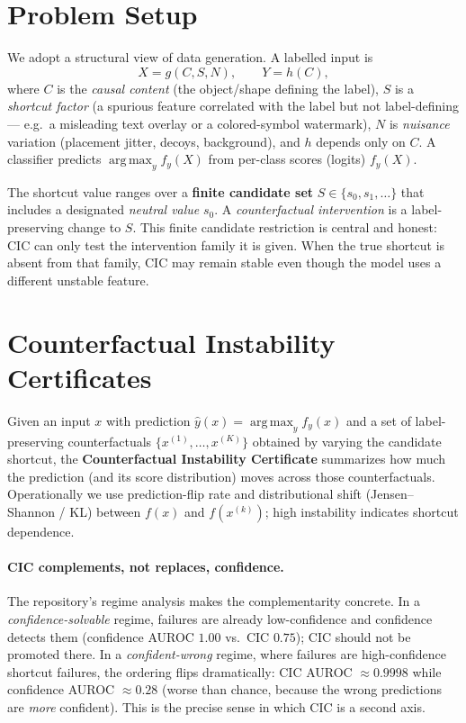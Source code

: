 \documentclass[11pt]{article}
\newcommand{\argmax}{\operatorname*{arg\,max}}
\begin{document}
\section{Problem Setup}\label{sec:setup}
We adopt a structural view of data generation. A labelled input is
\begin{equation}
X = g(C, S, N), \qquad Y = h(C),
\end{equation}
where $C$ is the \emph{causal content} (the object/shape defining the label), $S$ is
a \emph{shortcut factor} (a spurious feature correlated with the label but not
label-defining --- e.g.\ a misleading text overlay or a colored-symbol watermark),
$N$ is \emph{nuisance} variation (placement jitter, decoys, background), and $h$
depends only on $C$. A classifier predicts $\argmax_y f_y(X)$ from per-class scores
(logits) $f_y(X)$.

The shortcut value ranges over a \textbf{finite candidate set}
$S \in \{s_0, s_1, \dots\}$ that includes a designated \emph{neutral value} $s_0$.
A \emph{counterfactual intervention} is a label-preserving change to $S$. This finite
candidate restriction is central and honest: CIC can only test the intervention
family it is given. When the true shortcut is absent from that family, CIC may
remain stable even though the model uses a different unstable feature.

\section{Counterfactual Instability Certificates}\label{sec:cic}
Given an input $x$ with prediction $\hat{y}(x) = \argmax_y f_y(x)$ and a set of
label-preserving counterfactuals $\{x^{(1)},\dots,x^{(K)}\}$ obtained by varying the
candidate shortcut, the \textbf{Counterfactual Instability Certificate} summarizes
how much the prediction (and its score distribution) moves across those
counterfactuals. Operationally we use prediction-flip rate and distributional shift
(Jensen--Shannon / KL) between $f(x)$ and $f(x^{(k)})$; high instability indicates
shortcut dependence.

\paragraph{CIC complements, not replaces, confidence.}
The repository's regime analysis makes the complementarity concrete. In a
\emph{confidence-solvable} regime, failures are already low-confidence and confidence
detects them (confidence AUROC $1.00$ vs.\ CIC $0.75$); CIC should not be promoted
there. In a \emph{confident-wrong} regime, where failures are high-confidence
shortcut failures, the ordering flips dramatically: CIC AUROC $\approx 0.9998$ while
confidence AUROC $\approx 0.28$ (worse than chance, because the wrong predictions are
\emph{more} confident). This is the precise sense in which CIC is a second axis.
\end{document}
